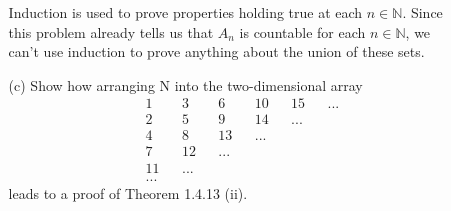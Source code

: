 \documentclass[12pt,letterpaper]{article}
\begin{document}
\begin{itemize}[leftmargin=!,labelindent=5pt]
\begin{itemize}
                Induction is used to prove properties holding true at each $n \in \mathbb{N}$.
                Since this problem already tells us that $A_n$ is countable for each $n \in \mathbb{N}$, we can't use induction to prove anything about the union of these sets.
                \item [(c)] Show how arranging N into the two-dimensional array
                    \begin{align*}
                        &1 && 3 && 6 && 10 && 15 && ... \\
                        &2 && 5 && 9 && 14 && ... \\
                        &4 && 8 && 13 && ... \\
                        &7 && 12 && ... \\
                        &11 && ... \\
                        &...
                    \end{align*}
                    leads to a proof of Theorem 1.4.13 (ii).
                    

\end{itemize}
\end{itemize}
\end{document}
